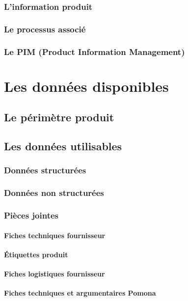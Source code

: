 \documentclass{report}
\begin{document}
        \section{L'information produit}
        \section{Le processus associé}
        \section{Le PIM (Product Information Management)}
\part{Les données disponibles}
    \chapter{Le périmètre produit}
    \chapter{Les données utilisables}
        \section{Données structurées}
        \section{Données non structurées}
        \section{Pièces jointes}
            \subsection{Fiches techniques fournisseur}
            \subsection{\'{E}tiquettes produit}
            \subsection{Fiches logistiques fournisseur}
            \subsection{Fiches techniques et argumentaires Pomona}
\end{document}
